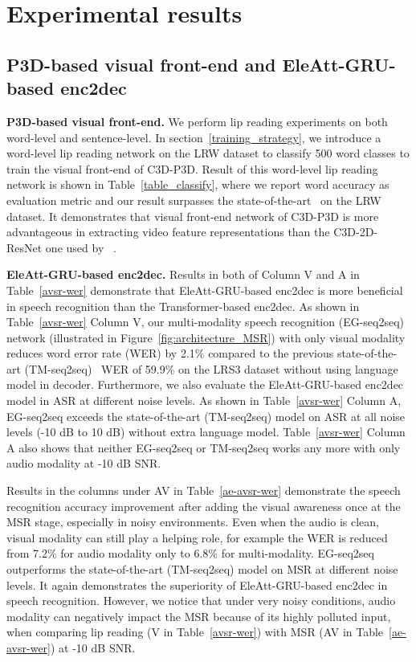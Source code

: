 \documentclass[10pt,twocolumn,letterpaper]{article}
\begin{document}
\section{Experimental results}
\subsection{P3D-based visual front-end and EleAtt-GRU-based enc2dec}\label{5.1}
{\bf P3D-based visual front-end.} We perform lip reading experiments on both word-level and sentence-level. In section~\ref{training_strategy}, we introduce a word-level lip reading network on the LRW dataset to classify 500 word classes to train the visual front-end of C3D-P3D. Result of this word-level lip reading network is shown in Table~\ref{table_classify}, where we report word accuracy as evaluation metric and our result surpasses the state-of-the-art~\cite{stafylakis2017combining} on the LRW dataset. It demonstrates that visual front-end network of C3D-P3D is more advantageous in extracting video feature representations than the C3D-2D-ResNet one used by ~\cite{Triantafyllos-avsr2018}. 

{\bf EleAtt-GRU-based enc2dec.} Results in both of Column V and A in Table~\ref{avsr-wer} demonstrate that EleAtt-GRU-based enc2dec is more beneficial in speech recognition than the Transformer-based enc2dec. As shown in Table~\ref{avsr-wer} Column V, our multi-modality speech recognition (EG-seq2seq) network (illustrated in Figure~\ref{fig:architecture_MSR}) with only visual modality reduces word error rate (WER) by 2.1\% compared to the previous state-of-the-art (TM-seq2seq)~\cite{Triantafyllos-avsr2018} WER of 59.9\% on the LRS3 dataset without using language model in decoder. Furthermore, we also evaluate the EleAtt-GRU-based enc2dec model in ASR at different noise levels. As shown in Table~\ref{avsr-wer} Column A, EG-seq2seq exceeds the state-of-the-art (TM-seq2seq) model on ASR at all noise levels (-10 dB to 10 dB) without extra language model. Table~\ref{avsr-wer} Column A also shows that neither EG-seq2seq or TM-seq2seq works any more with only audio modality at -10 dB SNR.

Results in the columns under AV in Table~\ref{ae-avsr-wer} demonstrate the speech recognition accuracy improvement after adding the visual awareness once at the MSR stage, especially in noisy environments. Even when the audio is clean, visual modality can still play a helping role, for example the WER is reduced from 7.2\% for audio modality only to 6.8\% for multi-modality. EG-seq2seq outperforms the state-of-the-art (TM-seq2seq) model on MSR at different noise levels. It again demonstrates the superiority of EleAtt-GRU-based enc2dec in speech recognition. However, we notice that under very noisy conditions, audio modality can negatively impact the MSR because of its highly polluted input, when comparing lip reading (V in Table~\ref{avsr-wer}) with MSR (AV in Table~\ref{ae-avsr-wer}) at -10 dB SNR.  
\end{document}
